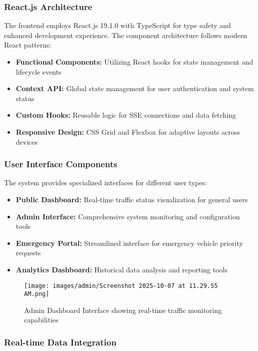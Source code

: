 \documentclass[conference]{IEEEtran}
\begin{document}
\subsubsection{React.js Architecture}

The frontend employs React.js 19.1.0 with TypeScript for type safety and enhanced development experience. The component architecture follows modern React patterns:

\begin{itemize}
\item \textbf{Functional Components:} Utilizing React hooks for state management and lifecycle events
\item \textbf{Context API:} Global state management for user authentication and system status
\item \textbf{Custom Hooks:} Reusable logic for SSE connections and data fetching
\item \textbf{Responsive Design:} CSS Grid and Flexbox for adaptive layouts across devices
\end{itemize}

\subsubsection{User Interface Components}

The system provides specialized interfaces for different user types:

\begin{itemize}
\item \textbf{Public Dashboard:} Real-time traffic status visualization for general users
\item \textbf{Admin Interface:} Comprehensive system monitoring and configuration tools
\item \textbf{Emergency Portal:} Streamlined interface for emergency vehicle priority requests
\item \textbf{Analytics Dashboard:} Historical data analysis and reporting tools
\end{itemize}

\begin{figure}[H]
\centering
\texttt{[image: images/admin/Screenshot 2025-10-07 at 11.29.55 AM.png]}
\caption{Admin Dashboard Interface showing real-time traffic monitoring capabilities}
\label{fig:admin_dashboard}
\end{figure}

\subsubsection{Real-time Data Integration}
\end{document}
